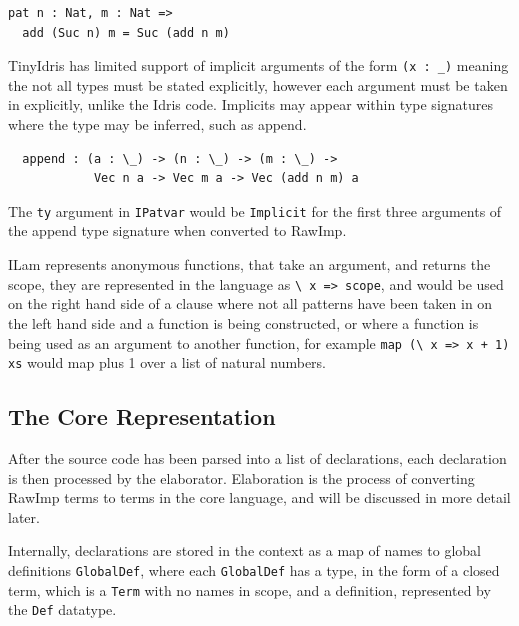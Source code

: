 \documentclass[a4paper]{article}
\begin{document}
\begin{center}
\begin{verbatim}
pat n : Nat, m : Nat =>
  add (Suc n) m = Suc (add n m) 
\end{verbatim}
\end{center}

TinyIdris has limited support of implicit arguments of the form
\texttt{(x : \_)} meaning the not all types must be stated explicitly,
however each argument must be taken in explicitly, unlike the Idris code.
Implicits may appear within type signatures where the type may be inferred,
such as append.


\begin{center}
\begin{verbatim}
  append : (a : \_) -> (n : \_) -> (m : \_) ->
            Vec n a -> Vec m a -> Vec (add n m) a
\end{verbatim}
\end{center}

The \texttt{ty} argument in \texttt{IPatvar} would be \texttt{Implicit} for the first three arguments
of the append type signature when converted to RawImp. 

ILam represents anonymous functions, that take an argument, and returns the
scope, they are represented in the language as \texttt{\textbackslash{} x => scope}, and would
be used on the right hand side of a clause where not all patterns have been taken  in on the
left hand side and a function is being constructed, or where a function is being used as an argument
to another function, for example \texttt{map (\textbackslash{} x => x + 1) xs} would map plus 1 over
a list of natural numbers.

\subsection{The Core Representation}
\label{sec:orgc03189c}

After the source code has been parsed into a list of declarations, each 
declaration is then processed by the elaborator. Elaboration is 
the process of converting RawImp terms to terms in the core language,
and will be discussed in more detail later. 

Internally, declarations are stored in the context as a map of names 
to global definitions \texttt{GlobalDef}, where each \texttt{GlobalDef} has a type, in the 
form of a closed term, which is a \texttt{Term} with no names in scope, and a 
definition, represented by the \texttt{Def} datatype.
\end{document}
